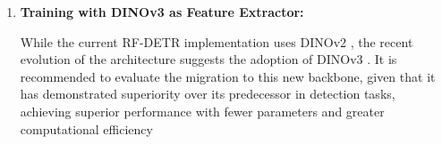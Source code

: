 \begin{enumerate}
    \item \textbf{Training with DINOv3 as Feature Extractor:}

    While the current RF-DETR implementation uses DINOv2 \cite{dinov2}, the recent evolution of the architecture suggests the adoption of DINOv3 \cite{dinov3}. It is recommended to evaluate the migration to this new backbone, given that it has demonstrated superiority over its predecessor in detection tasks, achieving superior performance with fewer parameters and greater computational efficiency \cite{deimv2}
\end{enumerate}
